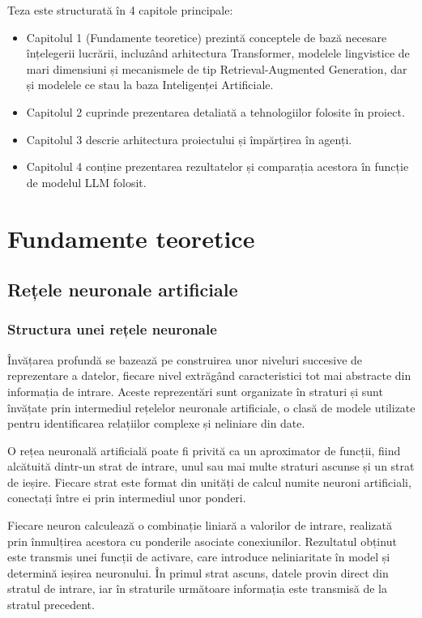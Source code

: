\documentclass[12pt, a4paper, oneside, romanian]{teza-upb}
\begin{document}
Teza este structurată în 4 capitole principale:
\begin{itemize}
    \item Capitolul 1 (Fundamente teoretice) prezintă conceptele de bază necesare înțelegerii lucrării, incluzând arhitectura Transformer, modelele lingvistice de mari dimensiuni și mecanismele de tip Retrieval-Augmented Generation, dar și modelele ce stau la baza Inteligenței Artificiale.
    \item Capitolul 2 cuprinde prezentarea detaliată a tehnologiilor folosite în proiect.
    \item Capitolul 3 descrie arhitectura proiectului și împărțirea în agenți.
    \item Capitolul 4 conține prezentarea rezultatelor și comparația acestora în funcție de modelul LLM folosit.
\end{itemize}


\cleardoublepage
\chapter{Fundamente teoretice}

\section{Rețele neuronale artificiale}
    \subsection{Structura unei rețele neuronale}

Învățarea profundă se bazează pe construirea unor niveluri succesive de reprezentare a datelor, fiecare nivel extrăgând caracteristici tot mai abstracte din informația de intrare. Aceste reprezentări sunt organizate în straturi și sunt învățate prin intermediul rețelelor neuronale artificiale, o clasă de modele utilizate pentru identificarea relațiilor complexe și neliniare din date.

O rețea neuronală artificială poate fi privită ca un aproximator de funcții, fiind alcătuită dintr-un strat de intrare, unul sau mai multe straturi ascunse și un strat de ieșire. Fiecare strat este format din unități de calcul numite neuroni artificiali, conectați între ei prin intermediul unor ponderi.

Fiecare neuron calculează o combinație liniară a valorilor de intrare, realizată prin înmulțirea acestora cu ponderile asociate conexiunilor. Rezultatul obținut este transmis unei funcții de activare, care introduce neliniaritate în model și determină ieșirea neuronului. În primul strat ascuns, datele provin direct din stratul de intrare, iar în straturile următoare informația este transmisă de la stratul precedent. \cite{curs_IA}
\end{document}
